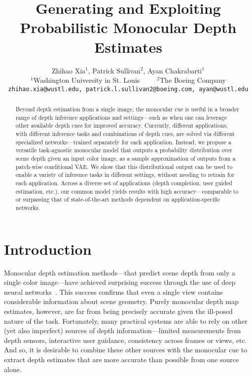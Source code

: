 \documentclass[10pt,twocolumn,letterpaper]{article}
\begin{document}
\title{Generating and Exploiting Probabilistic Monocular Depth Estimates}

\author{Zhihao Xia$^1$, Patrick Sullivan$^2$, Ayan Chakrabarti$^1$\\
  $^1$Washington University in St. Louis~~~~~$^2$The Boeing Company\\
  {\tt\small zhihao.xia@wustl.edu, patrick.l.sullivan2@boeing.com, ayan@wustl.edu}
}

\maketitle

\begin{abstract}
  Beyond depth estimation from a single image, the monocular cue is useful in a broader range of depth inference applications and settings---such as when one can leverage other available depth cues for improved accuracy. Currently, different applications, with different inference tasks and combinations of depth cues, are solved via different specialized networks---trained separately for each application. Instead, we propose a versatile task-agnostic monocular model that outputs a probability distribution over scene depth given an input color image, as a sample approximation of outputs from a patch-wise conditional VAE. We show that this distributional output can be used to enable a variety of inference tasks in different settings, without needing to retrain for each application. Across a diverse set of applications (depth completion, user guided estimation, etc.), our common model yields results with high accuracy---comparable to or surpassing that of state-of-the-art methods dependent on application-specific networks.
\end{abstract}

\section{Introduction}
\label{sec:intro}

Monocular depth estimation methods---that predict scene depth from only a single color image---have achieved surprising success through the use of deep neural networks~\cite{eigen2015predicting, wang2015towards, chakrabarti2016depth, fu2018deep, laina2016deeper}. This success confirms that even a single view contains considerable information about scene geometry. Purely monocular depth map estimates, however, are far from being precisely accurate given the ill-posed nature of the task. Fortunately, many practical systems are able to rely on other (yet also imperfect) sources of depth information---limited measurements from depth sensors, interactive user guidance, consistency across frames or views, etc. And so, it is desirable to combine these other sources with the monocular cue to extract depth estimates that are more accurate than possible from one source alone.
\end{document}
